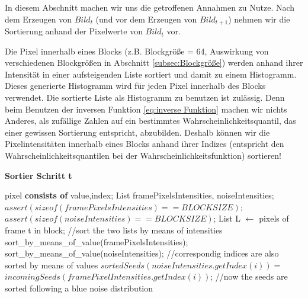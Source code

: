 In diesem Abschnitt machen wir uns die getroffenen  Annahmen 
zu Nutze. Nach dem Erzeugen von $Bild_{t}$ (und vor dem Erzeugen von $Bild_{t+1}$) nehmen wir die Sortierung
anhand der Pixelwerte von $Bild_{t}$ vor. 

\par

Die Pixel innerhalb eines Blocks (z.B. Blockgröße = 64, Auswirkung von verschiedenen Blockgrößen in Abschnitt \ref{subsec:Blockgröße}) werden anhand ihrer 
Intensität in einer aufsteigenden Liste sortiert und damit zu einem Histogramm. Dieses generierte Histogramm wird für jeden Pixel innerhalb des Blocks verwendet.
Die sortierte Liste als Histogramm zu benutzen ist zulässig. Denn beim Benutzen der inversen Funktion \ref{eq:inverse Funktion} machen wir nichts Anderes, als 
zufällige Zahlen auf ein bestimmtes Wahrscheinlichkeitsquantil, das einer gewissen Sortierung entspricht, abzubilden. Deshalb können wir die Pixelintensitäten 
innerhalb eines Blocks anhand ihrer Indizes (entspricht den Wahrscheinlichkeitsquantilen bei der Wahrscheinlichkeitsfunktion) sortieren! 

\begin{algorithm}[H]
    \caption{\textbf{Sortier Schritt t}}
    \begin{algorithmic}[1]
        \State pixel \textbf{consists of} value,index;
        \State List framePixelsIntensities, noiseIntensities;
        \State $assert(sizeof(framePixelsIntensities)==BLOCKSIZE)$;
        \State $assert(sizeof(noiseIntensities)==BLOCKSIZE)$;
        \State List L $\leftarrow$ pixels of frame t in block;
        \State \hfill
        \State //sort the two lists by means of intensities
        \State sort\_by\_means\_of\_value(framePixelsIntensities);
        \State sort\_by\_means\_of\_value(noiseIntensities);
        \State \hfill
        \State //correspondig indices are also sorted by means of values
        \State $sortedSeeds(noiseIntensities.getIndex(i)) = $
        \State $incomingSeeds(framePixelIntensities.getIndex(i))$;
        \EndFor
        \State //now the seeds are sorted following a blue noise distribution
    \end{algorithmic}
    \label{alg:Sortier}
\end{algorithm}

